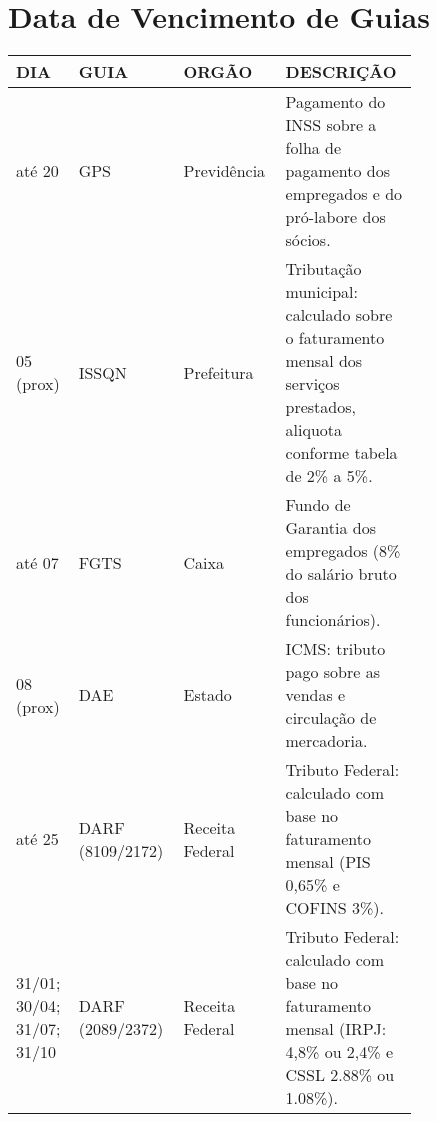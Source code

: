 \documentclass{article}
\begin{document}
\section{Data de Vencimento de Guias}
\begin{center}
  \begin{tabular}{|P{0.1\linewidth}|P{0.2\linewidth}|P{0.2\linewidth}|P{0.3\linewidth}|}
    \hline
    DIA & GUIA & ORGÃO & DESCRIÇÃO \\
    \hline
    até 20 & GPS & Previdência & Pagamento do INSS sobre a folha de pagamento dos empregados e do pró-labore dos sócios. \\
    05 (prox) & ISSQN & Prefeitura & Tributação municipal: calculado sobre o faturamento mensal dos serviços prestados, aliquota conforme tabela de 2\% a 5\%. \\
    até 07 & FGTS & Caixa & Fundo de Garantia dos empregados (8\% do salário bruto dos funcionários). \\
    08 (prox) & DAE & Estado & ICMS: tributo pago sobre as vendas e circulação de mercadoria. \\
    até 25 & DARF (8109/2172) & Receita Federal & Tributo Federal: calculado com base no faturamento mensal (PIS 0,65\% e COFINS 3\%). \\
    {\small 31/01; 30/04; 31/07; 31/10} & DARF (2089/2372) & Receita Federal & Tributo Federal: calculado com base no faturamento mensal (IRPJ: 4,8\% ou 2,4\% e CSSL 2.88\% ou 1.08\%). \\
    \hline

  \end{tabular}
\end{center}

\pagebreak
\end{document}
